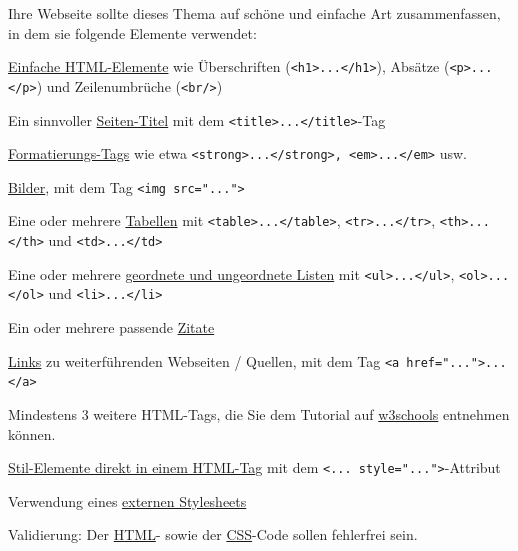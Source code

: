 Ihre Webseite sollte dieses Thema auf schöne und einfache Art zusammenfassen, in dem sie folgende Elemente verwendet:
\begin{todolist}
    \item \href{https://www.w3schools.com/html/html_basic.asp}{Einfache HTML-Elemente} wie Überschriften (\lstinline|<h1>...</h1>|), Absätze (\lstinline|<p>...</p>|) und Zeilenumbrüche (\lstinline|<br/>|)
    \item Ein sinnvoller \href{https://www.w3schools.com/html/html_page_title.asp}{Seiten-Titel} mit dem \lstinline|<title>...</title>|-Tag
    \item \href{https://www.w3schools.com/html/html_formatting.asp}{Formatierungs-Tags} wie etwa \lstinline|<strong>...</strong>, <em>...</em>| usw.
    \item \href{https://www.w3schools.com/html/html_images.asp}{Bilder}, mit dem Tag \lstinline|<img src="...">|
    \item Eine oder mehrere \href{https://www.w3schools.com/html/html_tables.asp}{Tabellen} mit \lstinline|<table>...</table>|, \lstinline|<tr>...</tr>|, \lstinline|<th>...</th>| und \lstinline|<td>...</td>|
    \item Eine oder mehrere \href{https://www.w3schools.com/html/html_lists.asp}{geordnete und ungeordnete Listen} mit \lstinline|<ul>...</ul>|, \lstinline|<ol>...</ol>| und \lstinline|<li>...</li>|
    \item Ein oder mehrere passende \href{https://www.w3schools.com/html/html_quotation_elements.asp}{Zitate}
    \item \href{https://www.w3schools.com/html/html_links.asp}{Links}  zu weiterführenden Webseiten / Quellen, mit dem Tag \lstinline|<a href="...">...</a>|
    \item Mindestens 3 weitere HTML-Tags, die Sie dem Tutorial auf \href{https://www.w3schools.com/html/html_quotation_elements.asp}{w3schools} entnehmen können.
    \item \href{https://www.w3schools.com/html/html_styles.asp}{Stil-Elemente direkt in einem HTML-Tag} mit dem \lstinline|<... style="...">|-Attribut
    \item Verwendung eines \href{https://www.w3schools.com/html/html_css.asp}{externen Stylesheets}
    \item Validierung: Der \href{https://validator.w3.org/nu/#textarea}{HTML}- sowie der \href{https://jigsaw.w3.org/css-validator/#validate_by_input}{CSS}-Code sollen fehlerfrei sein.
\end{todolist}

